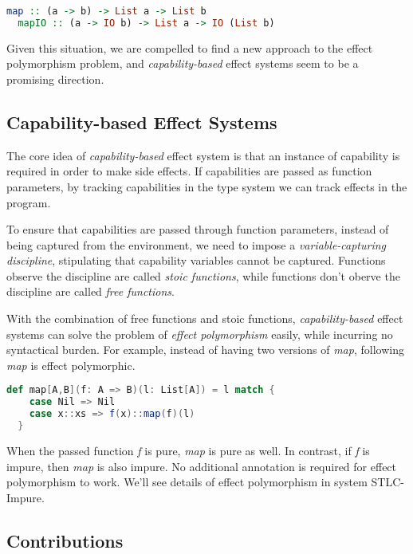 \begin{lstlisting}[language=Haskell]
  map :: (a -> b) -> List a -> List b
  mapIO :: (a -> IO b) -> List a -> IO (List b)
\end{lstlisting}

Given this situation, we are compelled to find a new approach to the
effect polymorphism problem, and \emph{capability-based} effect
systems seem to be a promising direction.

\subsection{Capability-based Effect Systems}

The core idea of \emph{capability-based} effect system is that an
instance of capability is required in order to make side effects. If
capabilities are passed as function parameters, by tracking
capabilities in the type system we can track effects in the program.

To ensure that capabilities are passed through function parameters,
instead of being captured from the environment, we need to impose a
\emph{variable-capturing discipline}, stipulating that capability
variables cannot be captured. Functions observe the discipline are
called \emph{stoic functions}, while functions don't oberve the
discipline are called \emph{free functions}.

With the combination of free functions and stoic functions,
\emph{capability-based} effect systems can solve the problem of
\emph{effect polymorphism} easily, while incurring no syntactical
burden. For example, instead of having two versions of \emph{map},
following \emph{map} is effect polymorphic.

\begin{lstlisting}[language=Scala]
  def map[A,B](f: A => B)(l: List[A]) = l match {
    case Nil => Nil
    case x::xs => f(x)::map(f)(l)
  }
\end{lstlisting}

When the passed function \emph{f} is pure, \emph{map} is pure as
well. In contrast, if \emph{f} is impure, then \emph{map} is also
impure. No additional annotation is required for effect polymorphism
to work. We'll see details of effect polymorphism in system
STLC-Impure.

\subsection{Contributions}

